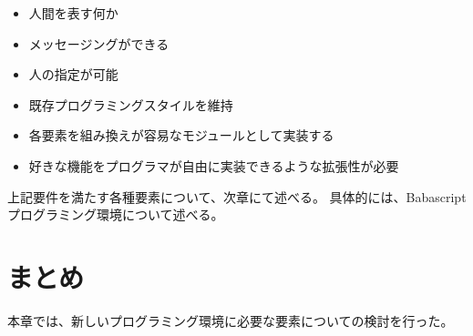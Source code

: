 \begin{itemize}
\itemsep1pt\parskip0pt
\item
  人間を表す何か
\item
  メッセージングができる
\item
  人の指定が可能
\item
  既存プログラミングスタイルを維持
\item
  各要素を組み換えが容易なモジュールとして実装する
\item
  好きな機能をプログラマが自由に実装できるような拡張性が必要
\end{itemize}

上記要件を満たす各種要素について、次章にて述べる。
具体的には、Babascriptプログラミング環境について述べる。

\section{まとめ}\label{ux307eux3068ux3081}

本章では、新しいプログラミング環境に必要な要素についての検討を行った。
